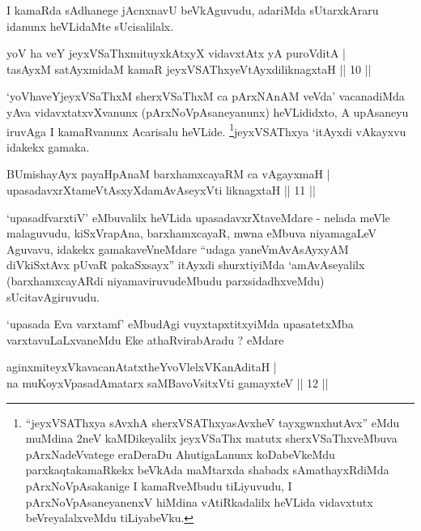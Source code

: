 \begin{artha}
I kamaRda sAdhanege jAcnxnavU beVkAguvudu, adariMda sUtarxkAraru idanunx heVLidaMte sUcisalilalx.
\end{artha}

\begin{shl}
yoV ha veY jeyxVSaThxmituyxkAtxyX vidavxtAtx yA puroVditA | \\
tasAyxM satAyxmidaM kamaR jeyxVSAThxyeVtAyxdiliknagxtaH \hfill|| 10 || 
\end{shl}

\begin{artha}
`yoVhaveYjeyxVSaThxM sherxVSaThxM ca pArxNAnAM veVda' vacanadiMda yAva vidavxtatxvXvanunx (pArxNoVpAsaneyanunx) heVLididxto, A upAsaneyu iruvAga I kamaRvanunx Acarisalu heVLide. \footnote{``jeyxVSAThxya sAvxhA sherxVSAThxyasAvxheV tayxgwnxhutAvx'' eMdu muMdina 2neV kaMDikeyalilx jeyxVSaThx matutx sherxVSaThxveMbuva pArxNadeVvatege eraDeraDu AhutigaLanunx koDabeVkeMdu parxkaqtakamaRkekx beVkAda maMtarxda shabadx sAmathayxRdiMda pArxNoVpAsakanige I kamaRveMbudu tiLiyuvudu, I pArxNoVpAsaneyanenxV hiMdina vAtiRkadalilx heVLida vidavxtutx beVreyalalxveMdu tiLiyabeVku.}jeyxVSAThxya `itAyxdi vAkayxvu idakekx gamaka.
\end{artha}

\begin{shl}
BUmishayAyx payaHpAnaM barxhamxcayaRM ca vAgayxmaH | \\
upasadavxrXtameVtAsxyXdamAvAseyxVti liknagxtaH \hfill|| 11 || 
\end{shl}

\begin{artha}
`upasadfvarxtiV' eMbuvalilx heVLida upasadavxrXtaveMdare - nelada meVle malaguvudu, kiSxVrapAna, barxhamxcayaR, mwna eMbuva niyamagaLeV Aguvavu, idakekx gamakaveVneMdare ``udaga yaneV\s mAvAsAyxyAM diVkiSxtAvx pUvaR pakaSxsayx'' itAyxdi shurxtiyiMda `amAvAseyalilx (barxhamxcayARdi niyamaviruvudeMbudu parxsidadhxveMdu) sUcitavAgiruvudu.
\end{artha}

\begin{artha}
`upasada Eva varxtamf' eMbudAgi vuyxtapxtitxyiMda upasatetxMba varxtavuLaLxvaneMdu Eke athaRvirabAradu ? eMdare
\end{artha}

\begin{shl}
aginxmiteyxVkavacanAtatxtheYvoVlelxVKanAditaH | \\
na muKoyxVpasadAmatarx saMBavoV\s sitxVti gamayxteV \hfill|| 12 || 
\end{shl}

